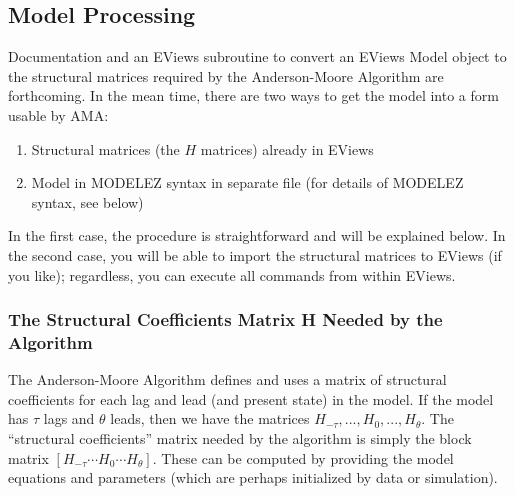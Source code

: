 \documentclass[11pt]{article}
\begin{document}
\subsection{Model Processing}
Documentation and an EViews subroutine to convert an EViews Model object to the structural matrices required by the Anderson-Moore Algorithm are forthcoming.  In the mean time, there are two ways to get the model into a form usable by AMA:
\begin{enumerate}
\item Structural matrices (the $H$ matrices) already in EViews
\item Model in MODELEZ syntax in separate file (for details of MODELEZ syntax, see below)
\end{enumerate}
In the first case, the procedure is straightforward and will be explained below.  In the second case, you will be able to import the structural matrices to EViews (if you like); regardless, you can execute all commands from within EViews. \\

\subsubsection{The Structural Coefficients Matrix H Needed by the Algorithm}
The Anderson-Moore Algorithm defines and uses a matrix of structural coefficients for each lag and lead (and present state) in the model.  If the model has $\tau$ lags and $\theta$ leads, then we have the matrices $H_{-\tau},...,H_0, ...,H_{\theta}$.  The ``structural coefficients'' matrix needed by the algorithm is simply the block matrix $\left[H_{-\tau}\cdots H_0 \cdots H_{\theta} \right] $.  These can be computed by providing the model equations and parameters (which are perhaps initialized by data or simulation).
\end{document}
